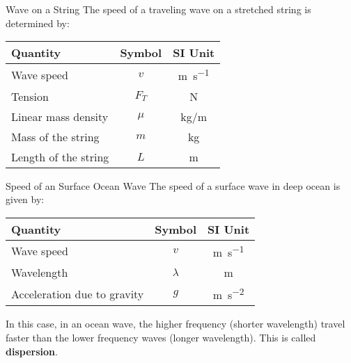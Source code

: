 \documentclass[12pt,aspectratio=169]{beamer}
\newcommand{\eq}[2]{\vspace{#1}{\Large\begin{displaymath}#2\end{displaymath}}}
\begin{document}
\begin{frame}{Wave on a String}
  The speed of a traveling wave on a stretched string is determined by:
  
  \eq{-.2in}{
    \boxed{v=\sqrt{\frac{F_T}{\mu}}}
    \quad\text{\normalsize where}\quad
    \boxed{\mu=\frac{m}{L}}
  }
  \begin{center}
    \begin{tabular}{l|c|c}
      \rowcolor{pink}
      \textbf{Quantity} & \textbf{Symbol} & \textbf{SI Unit} \\ \hline
      Wave speed           & $v$   & \si{\metre\per\second} \\
      Tension              & $F_T$ & \si{\newton} \\
      Linear mass density  & $\mu$ & \si{\kilo\gram/\metre} \\
      Mass of the string   & $m$   & \si{\kilo\gram} \\
      Length of the string & $L$   & \si{\metre}
    \end{tabular}
  \end{center}
\end{frame}



\begin{frame}{Speed of an Surface Ocean Wave}
  The speed of a surface wave in deep ocean is given by:
  
  \eq{-.2in}{
    \boxed{v=\sqrt{\frac{\lambda g}{2\pi}}}
  }
  \begin{center}
    \begin{tabular}{l|c|c}
      \rowcolor{pink}
      \textbf{Quantity} & \textbf{Symbol} & \textbf{SI Unit} \\ \hline
      Wave speed           & $v$       & \si{\metre\per\second} \\
      Wavelength           & $\lambda$ & \si{\metre} \\
      Acceleration due to gravity & $g$ & \si{\metre\per\second^2}
    \end{tabular}
  \end{center}
  In this case, in an ocean wave, the higher frequency (shorter wavelength)
  travel faster than the lower frequency waves (longer wavelength). This is
  called \textbf{dispersion}.
\end{frame}





\end{document}
